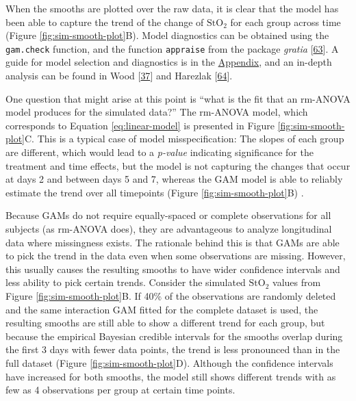 \documentclass[
]{article}
\newcommand{\passthrough}[1]{#1}
\begin{document}
When the smooths are plotted over the raw data, it is clear that the model has been able to capture the trend of the change of \(\mbox{StO}_2\) for each group across time (Figure \ref{fig:sim-smooth-plot}B). Model diagnostics can be obtained using the \passthrough{\lstinline!gam.check!} function, and the function \passthrough{\lstinline!appraise!} from the package \emph{gratia} {[}\protect\hyperlink{ref-gratia}{63}{]}. A guide for model selection and diagnostics is in the \protect\hyperlink{workflow}{Appendix}, and an in-depth analysis can be found in Wood {[}\protect\hyperlink{ref-wood2017}{37}{]} and Harezlak {[}\protect\hyperlink{ref-harezlak2018}{64}{]}.

One question that might arise at this point is ``what is the fit that an rm-ANOVA model produces for the simulated data?'' The rm-ANOVA model, which corresponds to Equation \eqref{eq:linear-model} is presented in Figure \ref{fig:sim-smooth-plot}C. This is a typical case of model misspecification: The slopes of each group are different, which would lead to a \emph{p-value} indicating significance for the treatment and time effects, but the model is not capturing the changes that occur at days 2 and between days 5 and 7, whereas the GAM model is able to reliably estimate the trend over all timepoints (Figure \ref{fig:sim-smooth-plot}B) .

Because GAMs do not require equally-spaced or complete observations for all subjects (as rm-ANOVA does), they are advantageous to analyze longitudinal data where missingness exists. The rationale behind this is that GAMs are able to pick the trend in the data even when some observations are missing. However, this usually causes the resulting smooths to have wider confidence intervals and less ability to pick certain trends. Consider the simulated \(\mbox{StO}_2\) values from Figure \ref{fig:sim-smooth-plot}B. If 40\% of the observations are randomly deleted and the same interaction GAM fitted for the complete dataset is used, the resulting smooths are still able to show a different trend for each group, but because the empirical Bayesian credible intervals for the smooths overlap during the first 3 days with fewer data points, the trend is less pronounced than in the full dataset (Figure \ref{fig:sim-smooth-plot}D). Although the confidence intervals have increased for both smooths, the model still shows different trends with as few as 4 observations per group at certain time points.
\end{document}

